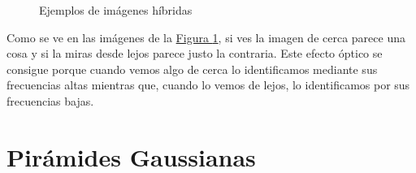 \documentclass[11pt,a4paper]{article}
\theoremstyle{plain}
\theoremstyle{definition}
\begin{document}
\begin{figure}[!h]
    \centering
    \caption{Ejemplos de imágenes híbridas}
    \label{hybrid}
\end{figure}

Como se ve en las imágenes de la \hyperref[hybrid]{Figura \ref*{hybrid}}, si ves la imagen de cerca parece una cosa y si la miras desde lejos parece justo la contraria. Este efecto óptico se consigue porque cuando vemos algo de cerca lo identificamos mediante sus frecuencias altas mientras que, cuando lo vemos de lejos, lo identificamos por sus frecuencias bajas.

\section{Pirámides Gaussianas}
\end{document}

